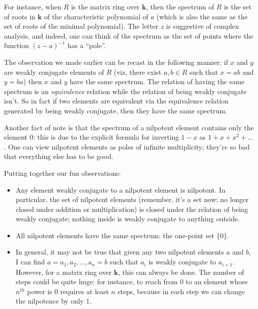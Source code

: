 \documentclass[a4paper]{amsart}
\newcommand{\field}{\mathbf{k}}
\begin{document}
For instance, when $R$ is the matrix ring over $\field$, then the
spectrum of $R$ is the set of roots in $\field$ of the characteristic
polynomial of $a$ (which is also the same as the set of roots of the
minimal polynomial). The letter $z$ is suggestive of complex analysis,
and indeed, one can think of the spectrum as the set of points where
the function $(z-a)^{-1}$ has a ``pole''.

The observation we made earlier can be recast in the following manner:
if $x$ and $y$ are weakly conjugate elements of $R$ (viz, there exist
$a,b \in R$ such that $x = ab$ and $y = ba$) then $x$ and $y$ have the
same spectrum. The relation of having the same spectrum is an {\em
  equivalence} relation while the relation of being weakly conjugate
isn't. So in fact if two elements are equivalent via the equivalence relation
generated by being weakly conjugate, then they have the same spectrum.

Another fact of note is that the spectrum of a nilpotent element
contains only the element $0$: this is due to the explicit formula for
inverting $1 - x$ as $1 + x + x^2 + \ldots$. One can view nilpotent
elements as poles of infinite multiplicity; they're so bad that
everything else has to be good.

Putting together our fun observations:

\begin{itemize}

\item Any element weakly conjugate to a nilpotent element is
  nilpotent. In particular, the set of nilpotent elements (remember,
  it's a set now; no longer closed under addition or multiplication)
  is closed under the relation of being weakly conjugate; nothing
  inside is weakly conjugate to anything outside.

\item All nilpotent elements have the same spectrum: the one-point set
  $\{ 0 \}$.

\item In general, it may not be true that given any two nilpotent
  elements $a$ and $b$, I can find $a = a_1, a_2, \ldots, a_n = b$
  such that $a_i$ is weakly conjugate to $a_{i+1}$. However, for a
  matrix ring over $\field$, this can always be done. The number of
  steps could be quite huge: for instance, to reach from $0$ to an
  element whose $n^{th}$ power is $0$ requires at least $n$ steps,
  because in each step we can change the nilpotence by only $1$.
\end{itemize}
\end{document}
